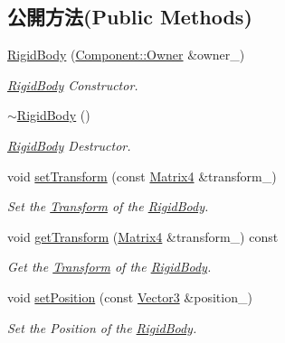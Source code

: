 \subsection*{公開方法(Public Methods)}
\begin{DoxyCompactItemize}
\item 
\hyperlink{class_i_dream_sky_1_1_physics3_1_1_rigid_body_ad70ccd573eadc1210eb3b73fd577eef4}{Rigid\+Body} (\hyperlink{class_i_dream_sky_1_1_component_1_1_owner}{Component\+::\+Owner} \&owner\+\_\+)
\begin{DoxyCompactList}\small\item\em \hyperlink{class_i_dream_sky_1_1_physics3_1_1_rigid_body}{Rigid\+Body} Constructor. \end{DoxyCompactList}\item 
\hyperlink{class_i_dream_sky_1_1_physics3_1_1_rigid_body_ab4afd414af763a22d983cbfe608d16ec}{$\sim$\+Rigid\+Body} ()
\begin{DoxyCompactList}\small\item\em \hyperlink{class_i_dream_sky_1_1_physics3_1_1_rigid_body}{Rigid\+Body} Destructor. \end{DoxyCompactList}\item 
void \hyperlink{class_i_dream_sky_1_1_physics3_1_1_rigid_body_a7d5e274aad11227be7f7bb64d76b9528}{set\+Transform} (const \hyperlink{class_i_dream_sky_1_1_matrix4}{Matrix4} \&transform\+\_\+)
\begin{DoxyCompactList}\small\item\em Set the \hyperlink{class_i_dream_sky_1_1_transform}{Transform} of the \hyperlink{class_i_dream_sky_1_1_physics3_1_1_rigid_body}{Rigid\+Body}. \end{DoxyCompactList}\item 
void \hyperlink{class_i_dream_sky_1_1_physics3_1_1_rigid_body_aa4aadcf4a7c9d546b99168890e808aba}{get\+Transform} (\hyperlink{class_i_dream_sky_1_1_matrix4}{Matrix4} \&transform\+\_\+) const 
\begin{DoxyCompactList}\small\item\em Get the \hyperlink{class_i_dream_sky_1_1_transform}{Transform} of the \hyperlink{class_i_dream_sky_1_1_physics3_1_1_rigid_body}{Rigid\+Body}. \end{DoxyCompactList}\item 
void \hyperlink{class_i_dream_sky_1_1_physics3_1_1_rigid_body_a7144cd88a27218db578d6d767c06e474}{set\+Position} (const \hyperlink{class_i_dream_sky_1_1_vector3}{Vector3} \&position\+\_\+)
\begin{DoxyCompactList}\small\item\em Set the Position of the \hyperlink{class_i_dream_sky_1_1_physics3_1_1_rigid_body}{Rigid\+Body}. \end{DoxyCompactList}\item 

\end{DoxyCompactItemize}
